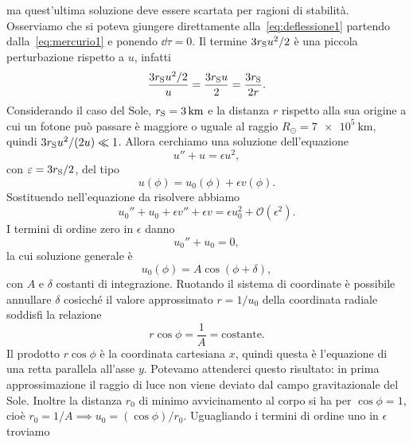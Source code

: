 ma quest'ultima soluzione deve essere scartata per ragioni di stabilità.
Osserviamo che si poteva giungere direttamente alla~\eqref{eq:deflessione1}
partendo dalla~\eqref{eq:mercurio1} e ponendo $\dd\tau = 0$.  Il termine
$3r_{\textup{S}}u^{2}/2$ è una piccola perturbazione rispetto a $u$, infatti
\begin{equation}
  \frac{3r_{\textup{S}}u^{2}/2}{u} = \frac{3r_{\textup{S}}u}{2} =
  \frac{3r_{\textup{S}}}{2r}.
\end{equation}
Considerando il caso del Sole, $r_{\textup{S}} = \SI{3}{\kilo\metre}$ e la
distanza $r$ rispetto alla sua origine a cui un fotone può passare è maggiore o
uguale al raggio $R_{\odot} = \SI{7e5}{\kilo\metre}$, quindi
$3r_{\textup{S}}u^{2}/(2u) \ll 1$.  Allora cerchiamo una soluzione dell'equazione
\begin{equation}
  u'' + u = \epsilon u^{2},
\end{equation}
con $\epsilon = 3r_{\textup{S}}/2$, del tipo
\begin{equation}
  u(\phi) = u_{0}(\phi) + \epsilon v(\phi).
\end{equation}
Sostituendo nell'equazione da risolvere abbiamo
\begin{equation}
  \label{eq:deflessione2}
  u_{0}'' + u_{0} + \epsilon v'' + \epsilon v = \epsilon u_{0}^{2} +
  \mathcal{O}(\epsilon^{2}).
\end{equation}
I termini di ordine zero in $\epsilon$ danno
\begin{equation}
  u_{0}'' + u_{0} = 0,
\end{equation}
la cui soluzione generale è
\begin{equation}
  u_{0}(\phi) = A\cos(\phi + \delta),
\end{equation}
con $A$ e $\delta$ costanti di integrazione.  Ruotando il sistema di coordinate
è possibile annullare $\delta$ cosicché il valore approssimato $r = 1/u_{0}$
della coordinata radiale soddisfi la relazione
\begin{equation}
  r \cos\phi = \frac{1}{A} = \text{costante}.
\end{equation}
Il prodotto $r\cos\phi$ è la coordinata cartesiana $x$, quindi questa è
l'equazione di una retta parallela all'asse $y$.  Potevamo attenderci questo
risultato: in prima approssimazione il raggio di luce non viene deviato dal
campo gravitazionale del Sole.  Inoltre la distanza $r_{0}$ di minimo
avvicinamento al corpo si ha per $\cos\phi = 1$, cioè
$r_{0} = 1/A \implies u_{0} = (\cos\phi)/r_{0}$.  Uguagliando i termini di
ordine uno in $\epsilon$ troviamo
